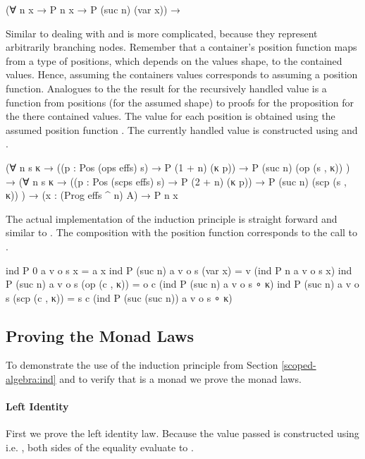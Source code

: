 \begin{AgdaAlign}
\begin{code}
  (∀ {n x} → P n x → P (suc n) (var x))  →
\end{code}
Similar to  dealing with  and
 is more complicated, because they represent
arbitrarily branching nodes.
Remember that a container's position function maps from a type of positions,
which depends on the values shape, to the contained values.
Hence, assuming the containers values corresponds to assuming a position
function.
Analogues to the  the result for the recursively handled value
is a function from positions (for the assumed shape) to proofs for the
proposition for the there contained values.
The value for each position is obtained using the assumed position function
.
The currently handled value is constructed using  and  
.
\begin{code}
  (∀ {n} s {κ}  →  ((p : Pos (ops   effs) s) → P (1 + n)  (κ p))  → P (suc n) (op   (s , κ))  )  →
  (∀ {n} s {κ}  →  ((p : Pos (scps  effs) s) → P (2 + n)  (κ p))  → P (suc n) (scp  (s , κ))  )  →
  (x : (Prog effs ^ n) A) → P n x
\end{code}
The actual implementation of the induction principle is straight forward and
similar to .
The composition with the position function corresponds to the call to
.
\begin{code}
ind P 0       a v o s x               = a x
ind P (suc n) a v o s (var x)         = v    (ind P n              a v o s x)
ind P (suc n) a v o s (op   (c , κ))  = o c  (ind P (suc n)        a v o s ∘ κ)
ind P (suc n) a v o s (scp  (c , κ))  = s c  (ind P (suc (suc n))  a v o s ∘ κ)
\end{code}
\end{AgdaAlign}


\subsection{Proving the Monad Laws}
\label{scoped-algebra:monad-laws}

To demonstrate the use of the induction principle from Section
\ref{scoped-algebra:ind} and to verify that 
\AgdaSpace{}\AgdaSpace{}
is a monad we prove the monad laws.

\paragraph{Left Identity}
First we prove the left identity law.
Because the value passed \AgdaFunction{>>=} is constructed using
 i.e. , both sides of the
equality evaluate to \AgdaSpace{}.

